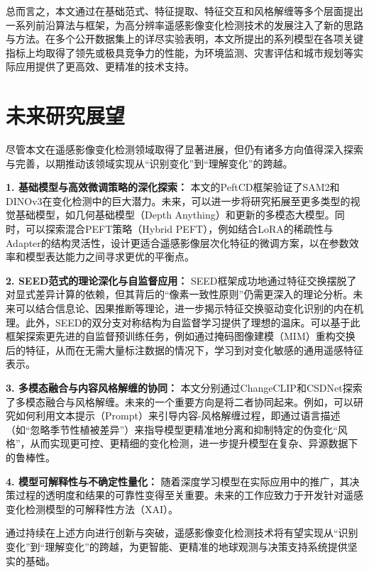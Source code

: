 总而言之，本文通过在基础范式、特征提取、特征交互和风格解缠等多个层面提出一系列前沿算法与框架，为高分辨率遥感影像变化检测技术的发展注入了新的思路与方法。在多个公开数据集上的详尽实验表明，本文所提出的系列模型在各项关键指标上均取得了领先或极具竞争力的性能，为环境监测、灾害评估和城市规划等实际应用提供了更高效、更精准的技术支持。

\section{未来研究展望}

尽管本文在遥感影像变化检测领域取得了显著进展，但仍有诸多方向值得深入探索与完善，以期推动该领域实现从“识别变化”到“理解变化”的跨越。

\textbf{1. 基础模型与高效微调策略的深化探索：} 本文的PeftCD框架验证了SAM2和DINOv3在变化检测中的巨大潜力。未来，可以进一步将研究拓展至更多类型的视觉基础模型，如几何基础模型（Depth Anything）和更新的多模态大模型。同时，可以探索混合PEFT策略（Hybrid PEFT），例如结合LoRA的稀疏性与Adapter的结构灵活性，设计更适合遥感影像层次化特征的微调方案，以在参数效率和模型表达能力之间寻求更优的平衡点。

\textbf{2. SEED范式的理论深化与自监督应用：} SEED框架成功地通过特征交换摆脱了对显式差异计算的依赖，但其背后的“像素一致性原则”仍需更深入的理论分析。未来可以结合信息论、因果推断等理论，进一步揭示特征交换驱动变化识别的内在机理。此外，SEED的双分支对称结构为自监督学习提供了理想的温床。可以基于此框架探索更先进的自监督预训练任务，例如通过掩码图像建模（MIM）重构交换后的特征，从而在无需大量标注数据的情况下，学习到对变化敏感的通用遥感特征表示。

\textbf{3. 多模态融合与内容风格解缠的协同：} 本文分别通过ChangeCLIP和CSDNet探索了多模态融合与风格解缠。未来的一个重要方向是将二者协同起来。例如，可以研究如何利用文本提示（Prompt）来引导内容-风格解缠过程，即通过语言描述（如“忽略季节性植被差异”）来指导模型更精准地分离和抑制特定的伪变化“风格”，从而实现更可控、更精细的变化检测，进一步提升模型在复杂、异源数据下的鲁棒性。

\textbf{4. 模型可解释性与不确定性量化：} 随着深度学习模型在实际应用中的推广，其决策过程的透明度和结果的可靠性变得至关重要。未来的工作应致力于开发针对遥感变化检测模型的可解释性方法（XAI）。

通过持续在上述方向进行创新与突破，遥感影像变化检测技术将有望实现从“识别变化”到“理解变化”的跨越，为更智能、更精准的地球观测与决策支持系统提供坚实的基础。